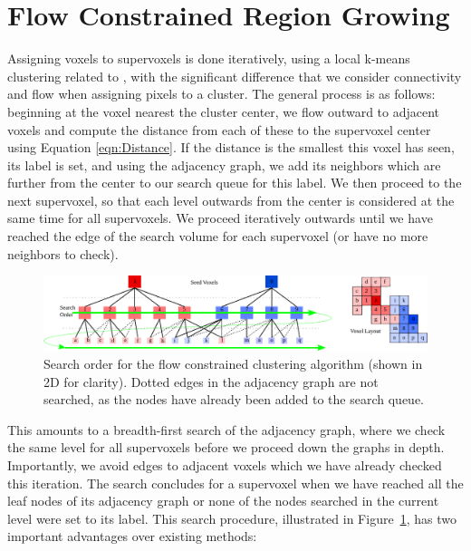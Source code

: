 \section{Flow Constrained Region Growing}
\label{subsec:FlowClustering}
Assigning voxels to supervoxels is done iteratively, using a local k-means clustering related to \cite{SLICCompared,DASP}, with the significant difference that we consider connectivity and flow when assigning pixels to a cluster. The general process is as follows: beginning at the voxel nearest the cluster center, we flow outward to adjacent voxels and compute the distance from each of these to the supervoxel center using Equation \ref{eqn:Distance}. If the distance is the smallest this voxel has seen, its label is set, and using the adjacency graph, we add its neighbors which are further from the center to our search queue for this label. We then proceed to the next supervoxel, so that each level outwards from the center is considered at the same time for all supervoxels. We proceed iteratively outwards until we have reached the edge of the search volume for each supervoxel (or have no more neighbors to check).

\begin{figure}
\begin{center}
   \includegraphics[width=0.95\linewidth]{figures/CVPR2013/SearchOrder.pdf}
\end{center}
   \caption[Voxel Search Order]{Search order for the flow constrained clustering algorithm (shown in 2D for clarity). Dotted edges in the adjacency graph are not searched, as the nodes have already been added to the search queue.}
\label{fig:ClusterSearch}
\end{figure}


This amounts to a breadth-first search of the adjacency graph, where we check the same level for all supervoxels before we proceed down the graphs in depth. Importantly, we avoid edges to adjacent voxels which we have already checked this iteration. The search concludes for a supervoxel when we have reached all the leaf nodes of its adjacency graph or none of the nodes searched in the current level were set to its label. This search procedure, illustrated in Figure~\ref{fig:ClusterSearch}, has two important advantages over existing methods:

